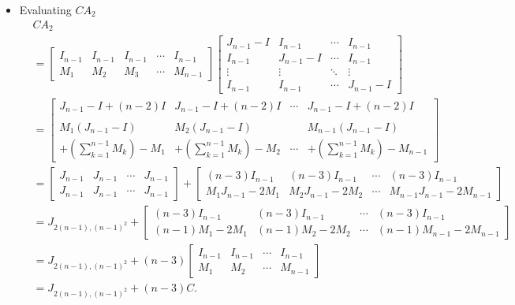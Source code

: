 \begin{itemize}
    \item Evaluating $CA_2$
    \begin{align*}
        &CA_2 \\
        &=\begin{bmatrix}
            I_{n-1} & I_{n-1} & I_{n-1} & \cdots & I_{n-1} \\
            M_1 & M_2 & M_3 & \cdots & M_{n-1}
        \end{bmatrix}
        \begin{bmatrix}
            J_{n-1} - I & I_{n-1} & \cdots & I_{n-1} \\
            I_{n-1} & J_{n-1} - I & \cdots & I_{n-1} \\
            \vdots & \vdots & \ddots & \vdots \\
            I_{n-1} & I_{n-1} & \cdots & J_{n-1} - I
        \end{bmatrix} \\
        &= \begin{bmatrix}
            J_{n-1}-I + (n-2)I & J_{n-1}-I + (n-2)I & \cdots & J_{n-1}-I + (n-2)I \\\\
            M_1(J_{n-1}-I) & M_2(J_{n-1}-I) &  & M_{n-1}(J_{n-1}-I) \\+ \left(\sum_{k=1}^{n-1}M_k\right) - M_1 & + \left(\sum_{k=1}^{n-1}M_k\right) - M_2 & \cdots & +\left(\sum_{k=1}^{n-1}M_k\right) - M_{n-1} 
        \end{bmatrix} \\
        &= \begin{bmatrix}
            J_{n-1} & J_{n-1} & \cdots & J_{n-1} \\
            J_{n-1} & J_{n-1} & \cdots & J_{n-1}
        \end{bmatrix} +
        \begin{bmatrix}
            (n-3)I_{n-1} & (n-3)I_{n-1} & \cdots & (n-3)I_{n-1}\\
            M_1J_{n-1} - 2M_1 & M_2J_{n-1} - 2M_2 & \cdots & M_{n-1}J_{n-1} - 2M_{n-1}
        \end{bmatrix} \\
        &= J_{2(n-1),(n-1)^2} +
        \begin{bmatrix}
            (n-3)I_{n-1} & (n-3)I_{n-1} & \cdots & (n-3)I_{n-1}\\
            (n-1)M_1 - 2M_1 & (n-1)M_2 - 2M_2 & \cdots & (n-1)M_{n-1} - 2M_{n-1}
        \end{bmatrix} \\
        &= J_{2(n-1),(n-1)^2} +
        (n-3)\begin{bmatrix}
            I_{n-1} & I_{n-1} & \cdots & I_{n-1}\\
            M_1 & M_2 & \cdots & M_{n-1}
        \end{bmatrix} \\
        &=
        J_{2(n-1),(n-1)^2} + (n-3)C.
    \end{align*}
    

\end{itemize}
